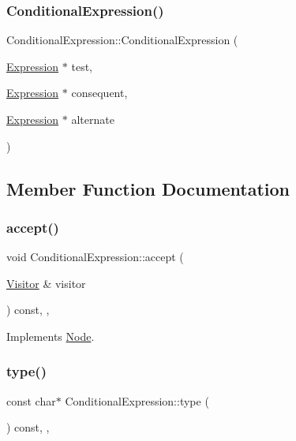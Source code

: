 \subsubsection{\texorpdfstring{Conditional\+Expression()}{ConditionalExpression()}}
{\footnotesize\ttfamily Conditional\+Expression\+::\+Conditional\+Expression (\begin{DoxyParamCaption}\item[{\hyperlink{struct_expression}{Expression} $\ast$}]{test,  }\item[{\hyperlink{struct_expression}{Expression} $\ast$}]{consequent,  }\item[{\hyperlink{struct_expression}{Expression} $\ast$}]{alternate }\end{DoxyParamCaption})\hspace{0.3cm}{\ttfamily [inline]}}



\subsection{Member Function Documentation}
\mbox{\label{struct_conditional_expression_af3883c99eba0226e3fbd424a672bcf7b}} 
\subsubsection{\texorpdfstring{accept()}{accept()}}
{\footnotesize\ttfamily void Conditional\+Expression\+::accept (\begin{DoxyParamCaption}\item[{\hyperlink{struct_visitor}{Visitor} \&}]{visitor }\end{DoxyParamCaption}) const\hspace{0.3cm}{\ttfamily [inline]}, {\ttfamily [override]}, {\ttfamily [virtual]}}



Implements \hyperlink{struct_node_a10bd7af968140bbf5fa461298a969c71}{Node}.

\mbox{\label{struct_conditional_expression_a3674bdc7e784cf84037aa273ebde4745}} 
\subsubsection{\texorpdfstring{type()}{type()}}
{\footnotesize\ttfamily const char$\ast$ Conditional\+Expression\+::type (\begin{DoxyParamCaption}{ }\end{DoxyParamCaption}) const\hspace{0.3cm}{\ttfamily [inline]}, {\ttfamily [override]}, {\ttfamily [virtual]}}



